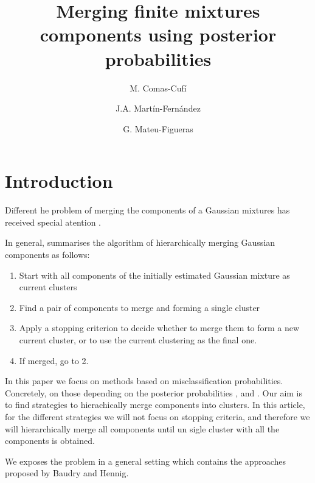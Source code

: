 \documentclass[10pt, a4paper]{article}
\title{Merging finite mixtures components using  posterior probabilities}
\author{M. Comas-Cufí \and J.A. Martín-Fernández \and G. Mateu-Figueras}
\newtheorem{prob}{Problem}
\begin{document}
\maketitle

\section{Introduction}

Different he problem of merging the components of a Gaussian mixtures has received special atention \cite{melnykov2013distribution,lee2004combining,hennig2010methods,baudry2010combining,pastore2013merging}. 

In general, \cite{hennig2010methods} summarises the algorithm of hierarchically merging Gaussian components as follows:
\begin{enumerate}
\item Start with all components of the initially estimated Gaussian mixture as current clusters
\item Find a pair of components to merge and forming a single cluster
\item Apply a stopping criterion to decide whether to merge them to form a new current cluster, or to use the current clustering as the final one.
\item If merged, go to 2.
\end{enumerate}

In this paper we focus on methods based on misclassification probabilities. Concretely, on those depending on the posterior probabilities \citep{melnykov2013distribution}, \citep{baudry2010combining} and \citep[in \textsc{demp} approach]{hennig2010methods}. Our aim is to find strategies to hierachically merge components into clusters. In this article, for the different strategies we will not focus on stopping criteria, and therefore we will hierarchically merge all components until un sigle cluster with all the components is obtained.


We exposes the problem in a general setting which contains the approaches proposed by Baudry and Hennig.


% 
%
\end{document}
